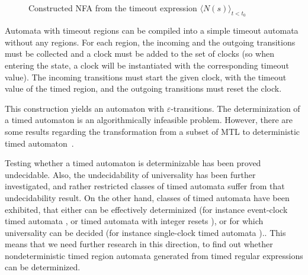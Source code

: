			
			\begin{figure}[h]
				\centering
				\caption{Constructed NFA from the timeout expression $\langle N(s) \rangle_{t<t_0}$}
				\label{fig:cep:nfatimed}
			\end{figure}
			
			
			Automata with timeout regions can be compiled into a simple timeout automata without any regions. 
			For each region, the incoming and the outgoing transitions must be collected and a clock must be added to the set of clocks (so when entering the state, a clock will be instantiated with the corresponding timeout value).
			The incoming transitions must start the given clock, with the timeout value of the timed region, and the outgoing transitions must reset the clock.
			
		
This construction yields an automaton with $\varepsilon$-transitions. The determinization of a timed automaton is an algorithmically infeasible problem.
However, there are some results regarding the transformation from a subset of MTL to deterministic timed automaton~\citep{nivckovic2010mtl}.
			
			Testing whether a timed automaton is determinizable has been proved undecidable\citep{finkel2006undecidable}.
			Also, the undecidability of universality has been further investigated, and rather restricted classes of timed automata suffer from that undecidability result. On the other hand, classes of timed automata have been exhibited, that either can be effectively determinized (for instance event-clock timed automata \citep{alur1994determinizable}, or timed automata
			with integer resets \citep{suman2008timed}), or for which universality can be decided (for instance single-clock timed automata \citep{ouaknine2004language}).\citep{baier2009timed}.
			This means that we need further research in this direction, to find out whether nondeterministic timed region automata generated from timed regular expressions can be determinized. 
			
